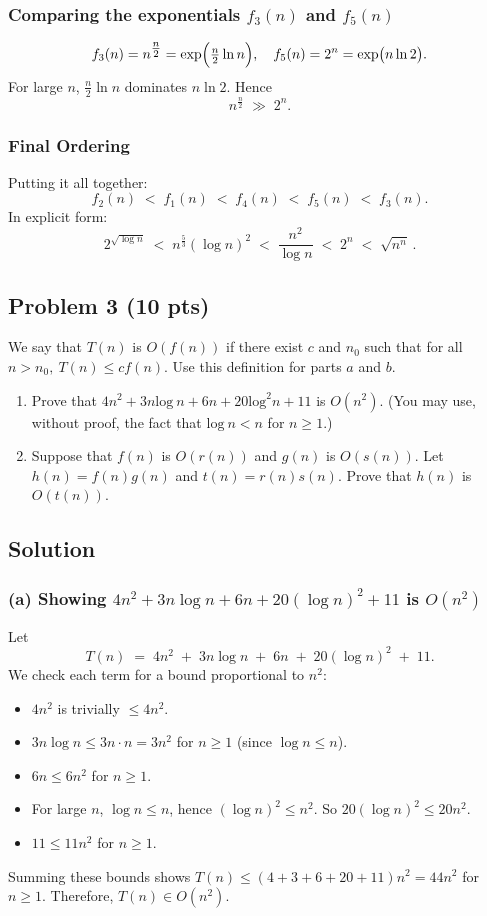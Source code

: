 \documentclass[12pt]{article}
\begin{document}
\subsubsection*{Comparing the exponentials $f_3(n)$ and $f_5(n)$}
\[
f_3(n) = n^{\tfrac{n}{2}} 
= \exp\Bigl(\tfrac{n}{2}\ln n\Bigr),
\quad
f_5(n) = 2^n 
= \exp\bigl(n\ln 2\bigr).
\]
For large \(n\), \(\tfrac{n}{2}\ln n\) dominates \(n\ln 2\). Hence 
\[
n^{\tfrac{n}{2}} \;\gg\; 2^n.
\]

\subsubsection*{Final Ordering}
Putting it all together:
\[
f_2(n) \;<\; f_1(n) \;<\; f_4(n) \;<\; f_5(n) \;<\; f_3(n).
\]
In explicit form:
\[
\boxed{
2^{\sqrt{\log n}} \;<\;
n^{\tfrac{5}{3}} (\log n)^2 \;<\;
\frac{n^2}{\log n} \;<\;
2^n \;<\;
\sqrt{n^n}\,.
}
\]

\subsection*{Problem 3 (10 pts)}
We say that $T(n)$ is $O(f(n))$ if there exist $c$ and $n_0$ such that for all $n > n_0,\:T(n) \le cf(n)$. Use this definition for parts $a$ and $b$.
\begin{enumerate}
    \item Prove that $4n^2 + 3n\text{log}\:n + 6n + 20\text{log}^2n + 11$ is $O(n^2)$. (You may use, without proof, the fact that $\text{log}\:n < n$ for $n \ge 1$.)
    \item Suppose that $f(n)$ is $O(r(n))$ and $g(n)$ is $O(s(n))$. Let $h(n) = f(n)g(n)$ and $t(n) = r(n)s(n)$. Prove that $h(n)$ is $O(t(n))$.
\end{enumerate}

\subsection*{Solution}

\subsubsection*{(a) Showing $4n^2 + 3n\log n + 6n + 20(\log n)^2 + 11$ is $O(n^2)$}

Let
\[
T(n) \;=\; 4n^2 \;+\; 3n\log n \;+\; 6n \;+\; 20(\log n)^2 \;+\; 11.
\]
We check each term for a bound proportional to \(n^2\):
\begin{itemize}
    \item \(4n^2\) is trivially \(\le 4n^2\).
    \item \(3n\log n \le 3n\cdot n = 3n^2\) for \(n\ge1\) (since \(\log n \le n\)).
    \item \(6n \le 6n^2\) for \(n\ge1\).
    \item For large \(n\), \(\log n \le n\), hence \((\log n)^2 \le n^2\). So \(20(\log n)^2 \le 20n^2\).
    \item \(11\le 11n^2\) for \(n\ge1\).
\end{itemize}
Summing these bounds shows \(T(n)\le (4+3+6+20+11)n^2 = 44n^2\) for \(n\ge1\). Therefore, \(T(n)\in O(n^2)\).
\end{document}

